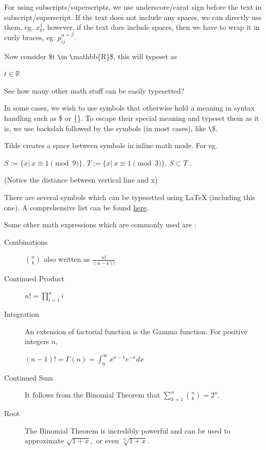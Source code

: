\documentclass[12pt, letterpaper]{article}
\theoremstyle{remark}
\begin{document}
    For using subscripts/superscripts, we use underscore/carat sign before the text in subscript/superscript. If the text does not 
    include any spaces, we can directly use them, eg. $x_0^1$, however, if the text does include spaces, then we have to wrap it in curly braces, eg. 
    $p^{\alpha + \beta}_{ij}$.

    Now consider \$t \verb!\!in \verb!\!mathbb\{R\}\$, this will typeset as
    
    \begin{center}
        $t \in \mathbb{R}$
    \end{center}
    
    See how many other math stuff can be easily typesetted?

    In some cases, we wish to use symbols that otherwise hold a meaning in syntax handling such as
    \$ or \{\}. To escape their special meaning and typeset them as it is, we use backslah followed by the symbols
    (in most cases), like \verb!\!\$.
    
    Tilde creates a space between symbols in inline math mode. For eg.
    
    \begin{center}
        $S :=\{x|~x\equiv 1 \pmod{9}\}$. $T :=\{x|~x \equiv 1\pmod{3}\}$. $S \subset T$ .
    \end{center} (Notice the distance between vertical line and x)

    There are several symbols which can be typesetted using \LaTeX{} (including this one). A comprehensive
    list can be found \href{https://oeis.org/wiki/List_of_LaTeX_mathematical_symbols}{here}.

    Some other math expressions which are commonly used are : 
    \begin{description}
        \item[Combinations] $\binom{n}{k}$ also written as $\frac{n!}{(n-k)!}$
        \item[Continued Product] $n!=\prod_{i=1}^{n} i $ 
        \item[Integration] An extension of factorial function is the Gamma function. For positive integers $n$,
            \begin{center}
                $(n-1)! = \Gamma(n)=\int_{0}^{\infty}x^{n-1}e^{-x}dx$ 
            \end{center}
        \item[Continued Sum] It follows from the Binomial Theorem that $\sum_{k=1}^{n}\binom{n}{k}=2^n$.
        \item[Root] The Binomial Theorem is incredibly powerful and can be used to approximate $\sqrt{1+x},$ 
        or even $\sqrt[71]{1+x}$.
    \end{description}
\end{document}
